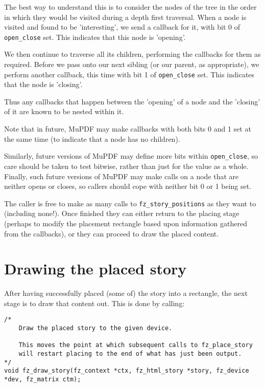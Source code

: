 \documentclass[oneside]{book}
\begin{document}
The best way to understand this is to consider the nodes of the tree in the order in which they would be visited during a depth first traversal. When a node is visited and found to be 'interesting', we send a callback for it, with bit 0 of \texttt{open\_close} set. This indicates that this node is 'opening'.

We then continue to traverse all its children, performing the callbacks for them as required. Before we pass onto our next sibling (or our parent, as appropriate), we perform another callback, this time with bit 1 of \texttt{open\_close} set. This indicates that the node is 'closing'.

Thus any callbacks that happen between the 'opening' of a node and the 'closing' of it are known to be nested within it.

Note that in future, MuPDF may make callbacks with both bits 0 and 1 set at the same time (to indicate that a node has no children).

Similarly, future versions of MuPDF may define more bits within \texttt{open\_close}, so care should be taken to test bitwise, rather than just for the value as a whole. Finally, such future versions of MuPDF may make calls on a node that are neither opens or closes, so callers should cope with neither bit 0 or 1 being set.

The caller is free to make as many calls to \texttt{fz\_story\_positions} as they want to (including none!). Once finished they can either return to the placing stage (perhaps to modify the placement rectangle based upon information gathered from the callbacks), or they can proceed to draw the placed content.

\section{Drawing the placed story}

After having successfully placed (some of) the story into a rectangle, the next stage is to draw that content out. This is done by calling:

\begin{lstlisting}
/*
	Draw the placed story to the given device.

	This moves the point at which subsequent calls to fz_place_story
	will restart placing to the end of what has just been output.
*/
void fz_draw_story(fz_context *ctx, fz_html_story *story, fz_device *dev, fz_matrix ctm);
\end{lstlisting}
\end{document}
